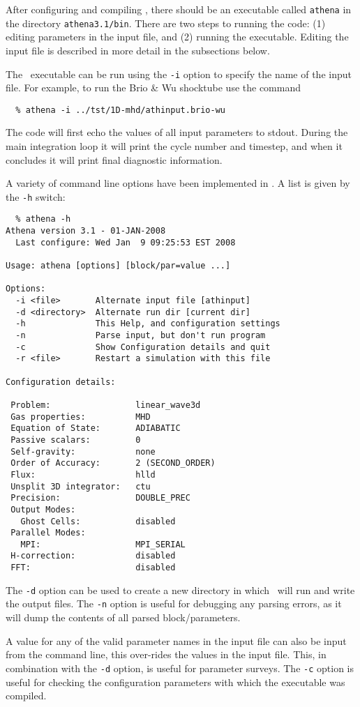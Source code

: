 After configuring and compiling \ath, there should be an executable
called {\tt athena} in the directory {\tt athena3.1/bin}.  There
are two steps to running the code: (1) editing parameters in the
input file, and (2) running the executable.  Editing the input file is 
described in more detail in the subsections below.

The \ath\ executable can be run using the {\tt -i} option to specify the name of
the input file.  For example, to run the Brio \& Wu shocktube use
the command
\begin{verbatim}
  % athena -i ../tst/1D-mhd/athinput.brio-wu
\end{verbatim}
The code will first echo the values of all input parameters to stdout.
During the main integration loop
it will print the cycle number and timestep, and
when it concludes it will print final diagnostic information.

A variety of command line options have been implemented in \ath.
A list is given by the {\tt -h} switch:
\begin{verbatim}
  % athena -h
Athena version 3.1 - 01-JAN-2008
  Last configure: Wed Jan  9 09:25:53 EST 2008

Usage: athena [options] [block/par=value ...]

Options:
  -i <file>       Alternate input file [athinput]
  -d <directory>  Alternate run dir [current dir]
  -h              This Help, and configuration settings
  -n              Parse input, but don't run program
  -c              Show Configuration details and quit
  -r <file>       Restart a simulation with this file

Configuration details:

 Problem:                 linear_wave3d
 Gas properties:          MHD
 Equation of State:       ADIABATIC
 Passive scalars:         0
 Self-gravity:            none
 Order of Accuracy:       2 (SECOND_ORDER)
 Flux:                    hlld
 Unsplit 3D integrator:   ctu
 Precision:               DOUBLE_PREC
 Output Modes:
   Ghost Cells:           disabled
 Parallel Modes:
   MPI:                   MPI_SERIAL
 H-correction:            disabled
 FFT:                     disabled
\end{verbatim}
The {\tt -d} option can be used to create a new directory in which
\ath\ will run and write the output files.  The {\tt -n} option is
useful for debugging any parsing errors, as it will dump the contents
of all parsed block/parameters.

A value for any of the valid parameter names in the input file can
also be input from the command line, this over-rides the values in the
input file.  This, in combination with the {\tt -d} option, is useful
for parameter surveys.  The {\tt -c} option is useful for checking the
configuration parameters with which the executable was compiled.

